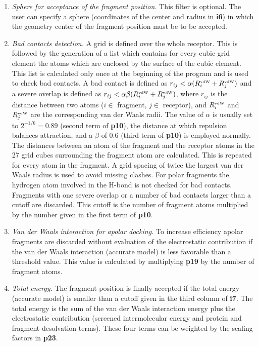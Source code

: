 \documentclass[a4paper,12pt,titlepage]{article}
\begin{document}
\begin{enumerate}

\item {\it Sphere for acceptance of the fragment position.}
This filter is optional. The user can specify a sphere (coordinates of the center and radius in 
{\bf i6}) in which the geometry center of the fragment position must be to be accepted.

\item {\it Bad contacts detection.}
A grid is defined over the whole receptor. This is followed by the generation of a list which contains 
for every cubic grid element the atoms which are enclosed by the surface of the cubic element. This list 
is calculated only once at the beginning of the program and is used to check bad contacts. A bad 
contact is defined as $r_{ij} < \alpha (R_i^{\mbox{\tiny vdW}}+R_j^{\mbox{\tiny vdW}})$ and a severe 
overlap is defined as $r_{ij} < \alpha \beta (R_i^{\mbox{\tiny vdW}}+R_j^{\mbox{\tiny vdW}})$, where 
$r_{ij}$ is the distance between two atoms ($i \in$ fragment, $j \in$ receptor), and 
$R_i^{\mbox{\tiny vdW}}$ and $R_j^{\mbox{\tiny vdW}}$ are the corresponding van der Waals radii. The 
value of $\alpha$ is usually set to $2^{-1/6}=0.89$ (second term of {\bf p10}), the distance at which 
repulsion balances attraction, and a $\beta$ of 0.6 (third term of {\bf p10}) is employed normally. 
The distances between an atom of the fragment and the receptor atoms in the 27 grid cubes 
surrounding the fragment atom are calculated. This is repeated for every atom in the fragment. A grid spacing of 
twice the largest van der Waals radius is used to avoid missing clashes. For polar fragments the 
hydrogen atom involved in the H-bond is not checked for bad contacts. Fragments with one severe overlap 
or a number of bad contacts larger than a cutoff are discarded. This cutoff is the number of 
fragment atoms multiplied by the number given in the first term of {\bf p10}.

\item {\it Van der Waals interaction for apolar docking.}
To increase efficiency apolar fragments are discarded without evaluation of the electrostatic 
contribution if the van der Waals interaction (accurate model) is less favorable than a threshold 
value. This value is 
calculated by multiplying {\bf p19} by the number of fragment atoms.

\item {\it Total energy.}
The fragment position is finally accepted if the total energy (accurate model) is smaller than a cutoff 
given in the 
third column of {\bf i7}. The total energy is the sum of the van der Waals interaction energy plus 
the electrostatic contribution (screened intermolecular energy and protein and fragment desolvation 
terms). These four terms can be weighted by the scaling factors in {\bf p23}.

\end{enumerate}
\end{document}
